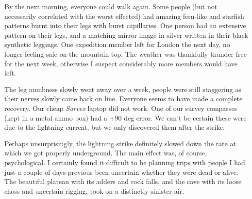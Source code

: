 By the next morning, everyone could walk again. Some people (but not necessarily correlated with the worst effected) had amazing fern-like and starfish patterns burnt into their legs with burst capillaries. One person had an extensive pattern on their legs, and a matching mirror image in silver written in their black synthetic leggings. One expedition member left for London the next day, no longer feeling safe on the mountain top. The weather was thankfully thunder free for the next week, otherwise I suspect considerably more members would have left. 

The leg numbness slowly went away over a week, people were still staggering as their nerves slowly came back on line. Everyone seems to have made a complete recovery. Our cheap \textit{Survex} laptop did not work. One of our survey compasses (kept in a metal ammo box) had a +90 deg error. We can't be certain these were due to the lightning current, but we only discovered them after the strike.




Perhaps unsurprisingly, the lightning strike definitely slowed down the rate at which we got properly underground.  The main effect was, of course, psychological. I certainly found it difficult to be planning trips with people I had just a couple of days previous been uncertain whether they were dead or alive. The beautiful plateau with its adders and rock falls, and the cave with its loose choss and uncertain rigging, took on a distinctly sinister air.

